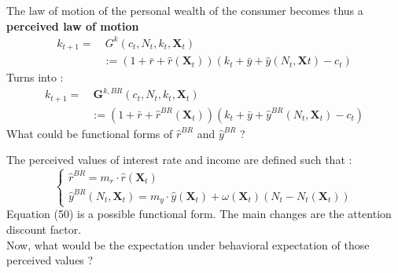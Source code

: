 \documentclass{beamer}
\begin{document}
\begin{frame}{\subsecname}
    The law of motion of the personal wealth of the consumer becomes thus a \textbf{perceived law of motion}
    \begin{equation}\tag{6}
        \begin{split}
            k_{t+1}= &\ G^{k}(c_{t},N_{t}, k_{t}, \bm{X}_{t}) \\ 
            & := (1+\bar{r}+\hat{r}(\bm{X}_{t}))(k_{t}+\bar{y}+\hat{y}(N_{t},\bm{X}t)-c_{t})
        \end{split}
    \end{equation}
    Turns into :    
    \begin{equation} \tag{49}
        \begin{split}
            k_{t+1}= &\  \textbf{G}^{k,BR}(c_{t},N_{t},k_{t},\textbf{X}_{t}) \\
            & := (1+\bar{r}+\hat{r}^{BR}(\textbf{X}_t))(k_{t}+\bar{y}+\hat{y}^{BR}(N_{t},\textbf{X}_t)-c_{t})
        \end{split}
    \end{equation}
    \hfill \linebreak
    What could be functional forms of $\hat{r}^{BR}$ and $\hat{y}^{BR}$ ?
\end{frame}

\begin{frame}{\subsecname}
    The perceived values of interest rate and income are defined such that :
    \begin{equation}\tag{50}
        \begin{cases}
            \hat{r}^{BR} = m_{r}\cdot\hat{r}(\textbf{X}_{t}) \\
            \hat{y}^{BR}(N_{t},\textbf{X}_{t}) = m_{y}\cdot\hat{y}(\textbf{X}_{t})+\omega(\textbf{X}_{t})(N_{t}-N_{t}(\textbf{X}_{t}))
        \end{cases}
    \end{equation}
    Equation (50) is a possible functional form. The main changes are the attention discount factor. \\
    Now, what would be the expectation under behavioral expectation of those perceived values ?
\end{frame}
\end{document}
